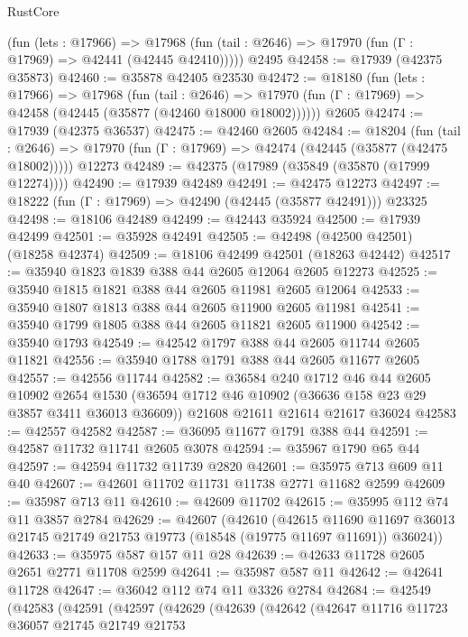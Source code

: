 \begin{lexlean}{RustCore}
\begin{coremodule}
      (fun (lets : @17966) =>
      @17968 (fun (tail : @2646) => @17970 (fun (Γ : @17969) => @42441 (@42445 @42410)))))
    @2495
@42458 := @17939 (@42375 @35873)
@42460 := @35878 @42405 @23530
@42472 := @18180
    (fun (lets : @17966) =>
    @17968
      (fun (tail : @2646) =>
      @17970 (fun (Γ : @17969) => @42458 (@42445 (@35877 (@42460 @18000 @18002))))))
    @2605
@42474 := @17939 (@42375 @36537)
@42475 := @42460 @2605
@42484 := @18204
    (fun (tail : @2646) => @17970 (fun (Γ : @17969) => @42474 (@42445 (@35877 (@42475 @18002)))))
    @12273
@42489 := @42375 (@17989 (@35849 (@35870 (@17999 @12274))))
@42490 := @17939 @42489
@42491 := @42475 @12273
@42497 := @18222 (fun (Γ : @17969) => @42490 (@42445 (@35877 @42491))) @23325
@42498 := @18106 @42489
@42499 := @42443 @35924
@42500 := @17939 @42499
@42501 := @35928 @42491
@42505 := @42498 (@42500 @42501) (@18258 @42374)
@42509 := @18106 @42499 @42501 (@18263 @42442)
@42517 := @35940 @1823 @1839 @388 @44 @2605 @12064 @2605 @12273
@42525 := @35940 @1815 @1821 @388 @44 @2605 @11981 @2605 @12064
@42533 := @35940 @1807 @1813 @388 @44 @2605 @11900 @2605 @11981
@42541 := @35940 @1799 @1805 @388 @44 @2605 @11821 @2605 @11900
@42542 := @35940 @1793
@42549 := @42542 @1797 @388 @44 @2605 @11744 @2605 @11821
@42556 := @35940 @1788 @1791 @388 @44 @2605 @11677 @2605
@42557 := @42556 @11744
@42582 := @36584
    @240
    @1712
    @46
    @44
    @2605
    @10902
    @2654
    @1530
    (@36594 @1712 @46 @10902 (@36636 @158 @23 @29 @3857 @3411 @36013 @36609))
    @21608
    @21611
    @21614
    @21617
    @36024
@42583 := @42557 @42582
@42587 := @36095 @11677 @1791 @388 @44
@42591 := @42587 @11732 @11741 @2605 @3078
@42594 := @35967 @1790 @65 @44
@42597 := @42594 @11732 @11739 @2820
@42601 := @35975 @713 @609 @11 @40
@42607 := @42601 @11702 @11731 @11738 @2771 @11682 @2599
@42609 := @35987 @713 @11
@42610 := @42609 @11702
@42615 := @35995 @112 @74 @11 @3857 @2784
@42629 := @42607
    (@42610
      (@42615
        @11690
        @11697
        @36013
        @21745
        @21749
        @21753
        @19773
        (@18548 (@19775 @11697 @11691))
        @36024))
@42633 := @35975 @587 @157 @11 @28
@42639 := @42633 @11728 @2605 @2651 @2771 @11708 @2599
@42641 := @35987 @587 @11
@42642 := @42641 @11728
@42647 := @36042 @112 @74 @11 @3326 @2784
@42684 := @42549
    (@42583
      (@42591
        (@42597
          (@42629
            (@42639
              (@42642
                (@42647
                  @11716
                  @11723
                  @36057
                  @21745
                  @21749
                  @21753

\end{coremodule}
\end{lexlean}
